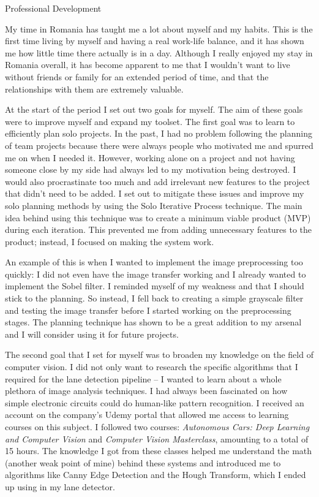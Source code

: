 \documentclass{matthijs}
\begin{document}
	\begin{hoofdstuk}{Professional Development}

		\setlength\parindent{1.5em}
		\setlength{\parskip}{0.5em plus 0.2em minus 0.1em}
		\linespread{1.2}
		\vspace{-1ex}

		My time in Romania has taught me a lot about myself and my habits.
		This is the first time living by myself and having a real work-life balance, and it has shown me how little time there actually is in a day.
		Although I really enjoyed my stay in Romania overall, it has become apparent to me that I wouldn't want to live without friends or family for an extended period of time, and that the relationships with them are extremely valuable.

		At the start of the period I set out two goals for myself.
		The aim of these goals were to improve myself and expand my toolset.
		The first goal was to learn to efficiently plan solo projects.
		In the past, I had no problem following the planning of team projects because there were always people who motivated me and spurred me on when I needed it.
		However, working alone on a project and not having someone close by my side had always led to my motivation being destroyed.
		I would also procrastinate too much and add irrelevant new features to the project that didn't need to be added.
		I set out to mitigate these issues and improve my solo planning methods by using the Solo Iterative Process technique.
		The main idea behind using this technique was to create a minimum viable product (MVP) during each iteration.
		This prevented me from adding unnecessary features to the product; instead, I focused on making the system work.
		
		An example of this is when I wanted to implement the image preprocessing too quickly: I did not even have the image transfer working and I already wanted to implement the Sobel filter.
		I reminded myself of my weakness and that I should stick to the planning.
		So instead, I fell back to creating a simple grayscale filter and testing the image transfer before I started working on the preprocessing stages.
		The planning technique has shown to be a great addition to my arsenal and I will consider using it for future projects.

		The second goal that I set for myself was to broaden my knowledge on the field of computer vision.
		I did not only want to research the specific algorithms that I required for the lane detection pipeline -- I wanted to learn about a whole plethora of image analysis techniques.
		I had always been fascinated on how simple electronic circuits could do human-like pattern recognition.
		I received an account on the company's Udemy portal that allowed me access to learning courses on this subject.
		I followed two courses: \textit{Autonomous Cars: Deep Learning and Computer Vision} and \textit{Computer Vision Masterclass}, amounting to a total of 15 hours.
		The knowledge I got from these classes helped me understand the math (another weak point of mine) behind these systems and introduced me to algorithms like Canny Edge Detection and the Hough Transform, which I ended up using in my lane detector.


\end{hoofdstuk}
\end{document}
